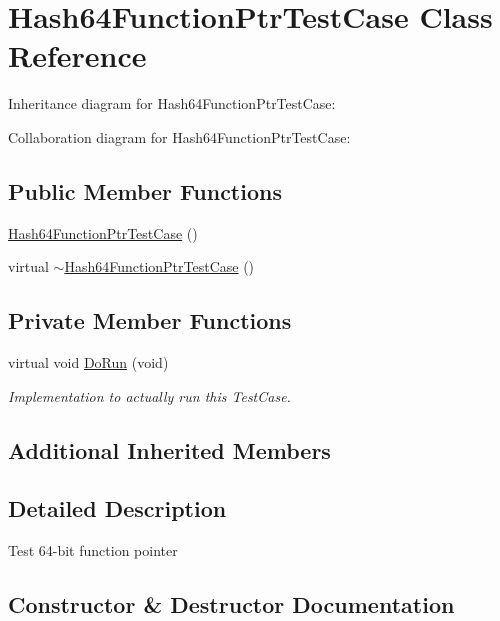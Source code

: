 \hypertarget{classHash64FunctionPtrTestCase}{}\section{Hash64\+Function\+Ptr\+Test\+Case Class Reference}
\label{classHash64FunctionPtrTestCase}


Inheritance diagram for Hash64\+Function\+Ptr\+Test\+Case\+:


Collaboration diagram for Hash64\+Function\+Ptr\+Test\+Case\+:
\subsection*{Public Member Functions}
\begin{DoxyCompactItemize}
\item 
\hyperlink{classHash64FunctionPtrTestCase_a1b28b0a7db84f4924b884fa8df31446a}{Hash64\+Function\+Ptr\+Test\+Case} ()
\item 
virtual \hyperlink{classHash64FunctionPtrTestCase_a743e73356f86a316c6931136c1ba7d46}{$\sim$\+Hash64\+Function\+Ptr\+Test\+Case} ()
\end{DoxyCompactItemize}
\subsection*{Private Member Functions}
\begin{DoxyCompactItemize}
\item 
virtual void \hyperlink{classHash64FunctionPtrTestCase_ae364f85f2a92f09ad92752745cd8181e}{Do\+Run} (void)
\begin{DoxyCompactList}\small\item\em Implementation to actually run this Test\+Case. \end{DoxyCompactList}\end{DoxyCompactItemize}
\subsection*{Additional Inherited Members}


\subsection{Detailed Description}
Test 64-\/bit function pointer 

\subsection{Constructor \& Destructor Documentation}

